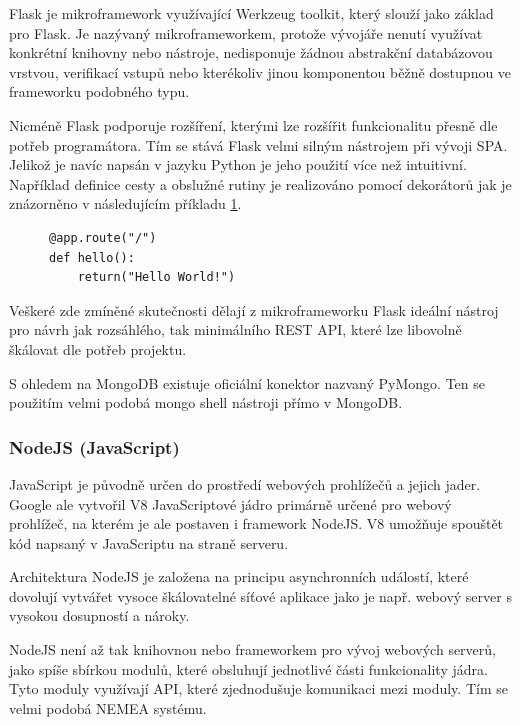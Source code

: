 Flask je mikroframework využívající Werkzeug toolkit, který slouží jako základ pro Flask. Je nazývaný mikroframeworkem, protože vývojáře nenutí využívat konkrétní knihovny nebo nástroje, nedisponuje žádnou abstrakční databázovou vrstvou, verifikací vstupů nebo kterékoliv jinou komponentou běžně dostupnou ve frameworku podobného typu.

Nicméně Flask podporuje rozšíření, kterými lze rozšířit funkcionalitu přesně dle potřeb programátora. Tím se stává Flask velmi silným nástrojem při vývoji SPA. Jelikož je navíc napsán v jazyku Python je jeho použití více než intuitivní. Například definice cesty a obslužné rutiny je realizováno pomocí dekorátorů jak je znázorněno v následujícím příkladu \ref{code:flask}.

\begin{figure}[h]
\lstset{basicstyle=\small,style=JSON}
\begin{lstlisting}
@app.route("/")
def hello():
    return("Hello World!")
\end{lstlisting}
\label{code:flask}
\end{figure}

Veškeré zde zmíněné skutečnosti dělají z mikroframeworku Flask ideální nástroj pro návrh jak rozsáhlého, tak minimálního REST API, které lze libovolně škálovat dle potřeb projektu.

S ohledem na MongoDB existuje oficiální konektor nazvaný PyMongo. Ten se použitím velmi podobá mongo shell nástroji přímo v MongoDB. 

\subsubsection*{NodeJS (JavaScript)}

JavaScript je původně určen do prostředí webových prohlížečů a jejich jader. Google ale vytvořil V8\cite{google:v8} JavaScriptové jádro primárně určené pro webový prohlížeč, na kterém je ale postaven i framework NodeJS. V8 umožňuje spouštět kód napsaný v JavaScriptu na straně serveru.

Architektura NodeJS je založena na principu asynchronních událostí, které dovolují vytvářet vysoce škálovatelné síťové aplikace jako je např. webový server s vysokou dosupností a nároky.

NodeJS není až tak knihovnou nebo frameworkem pro vývoj webových serverů, jako spíše sbírkou modulů, které obsluhují jednotlivé části funkcionality jádra\cite{nodejs}. Tyto moduly využívají API, které zjednodušuje komunikaci mezi moduly. Tím se velmi podobá NEMEA systému.

